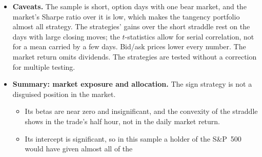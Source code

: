 \begin{itemize}
  selection uses the strategies' realized returns, so this is a stress test against them.
  \begin{itemize}
  \item The betas stay near zero (\rhebExBetaFullMin{} to \rhebExBetaFullMax, $t$ at most \rhebExBetaTFullMax). The
    intercept falls to \rhebExAlphaFullMin{} to \rhebExAlphaFullMax\% a day ($t$ from \rhebExAlphaTFullMin{} to
    \rhebExAlphaTFullMax), the maximum Sharpe ratio to \rhebExSRmaxFullMin{} to \rhebExSRmaxFullMax{} against
    \rhebSRmEx{} for the market, and the GRS test rejects for \rhebExGrsSigFullWord{} of the six ($p$ from
    \rhebExGrsPFullMin{} to \rhebExGrsPFullMax; at quoted bid/ask prices the $t$-test of $\alpha$ rejects for
    \rhebExAlphaSigFullXWord).
  \item The removed days are the short straddle's largest losses, so its intercept rises, to \rhebExAlphaShort\% a day
    ($t = \rhebExAlphaTShort$), above that of the full-set strategies. What remains of their $\alpha$ is the premium
    the short straddle earns on ordinary days, in line with Table~\ref{tab:rh_econ_bestdays}.
  \item In real time no combination is significantly above the market (mean--variance \rhebExRtMvFullMin{} to
    \rhebExRtMvFullMax, inverse volatility \rhebExRtIvFullMin{} to \rhebExRtIvFullMax, against \rhebSRmExRt).
  \end{itemize}
\item \textbf{Caveats.} The sample is short, \rheSzDays{} option days with one bear market, and the market's Sharpe
  ratio over it is low, which makes the tangency portfolio almost all strategy. The strategies' gains over the short
  straddle rest on the \rhebNBest{} days with large closing moves; the $t$-statistics allow for serial correlation, not
  for a mean carried by a few days. Bid/ask prices lower every number. The market return omits dividends. The
  strategies are tested without a correction for multiple testing.
\item \textbf{Summary: market exposure and allocation.} The sign strategy is not a disguised position in the market.
  \begin{itemize}
  \item Its betas are near zero and insignificant, and the convexity of the straddle shows in the trade's half hour,
    not in the daily market return.
  \item Its intercept is significant, so in this sample a holder of the S\&P~500 would have given almost all of the

\end{itemize}
\end{itemize}
